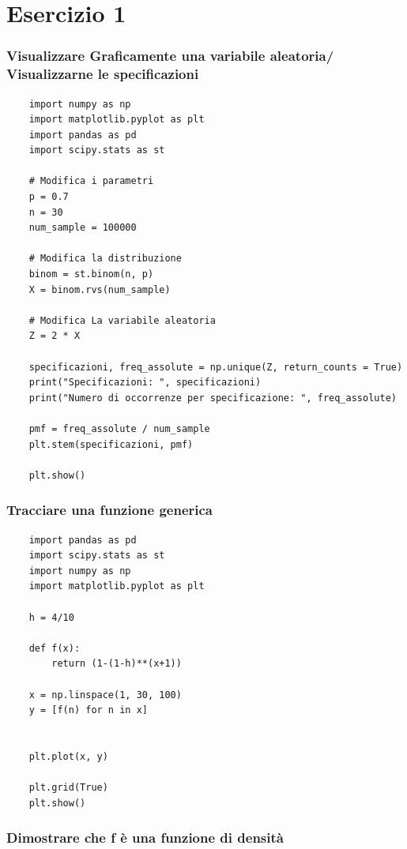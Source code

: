 \documentclass{article}
\begin{document}
\pagebreak

\section{Esercizio 1}

\subsubsection*{Visualizzare Graficamente una variabile aleatoria/ Visualizzarne le specificazioni}

\begin{lstlisting}
    import numpy as np
    import matplotlib.pyplot as plt
    import pandas as pd
    import scipy.stats as st

    # Modifica i parametri
    p = 0.7
    n = 30
    num_sample = 100000

    # Modifica la distribuzione
    binom = st.binom(n, p)
    X = binom.rvs(num_sample)

    # Modifica La variabile aleatoria
    Z = 2 * X

    specificazioni, freq_assolute = np.unique(Z, return_counts = True)
    print("Specificazioni: ", specificazioni)
    print("Numero di occorrenze per specificazione: ", freq_assolute)

    pmf = freq_assolute / num_sample
    plt.stem(specificazioni, pmf)

    plt.show()
\end{lstlisting}


\subsubsection*{Tracciare una funzione generica}

\begin{lstlisting}
    import pandas as pd
    import scipy.stats as st
    import numpy as np
    import matplotlib.pyplot as plt

    h = 4/10

    def f(x):
        return (1-(1-h)**(x+1))

    x = np.linspace(1, 30, 100)
    y = [f(n) for n in x]


    plt.plot(x, y)

    plt.grid(True)
    plt.show()
\end{lstlisting}

\pagebreak

\subsubsection*{Dimostrare che f è una funzione di densità}
\end{document}
